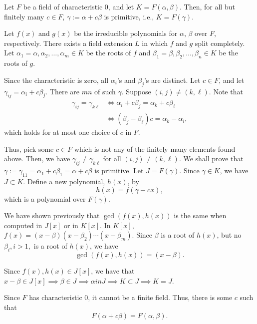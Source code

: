 
\begin{lem}\label{l35:lem1}
	Let $F$ be a field of characteristic $0$, and let $K = F(\alpha, \beta)$. Then, for all but finitely many $c \in F$, $\gamma := \alpha+ c \beta$ is primitive, i.e., $K = F(\gamma)$.
\end{lem}
\begin{dem}
	Let $f(x)$ and $g(x)$ be the irreducible polynomials for  $\alpha$, $\beta$ over $F$, respectively. There exists a field extension $L$ in which $f$ and $g$ split completely. Let $\alpha_1 = \alpha, \alpha_2, \dots, \alpha_m \in K$ be the roots of $f$ and $\beta_1 = \beta, \beta_2, \dots, \beta_n \in K$ be the roots of $g$.

	Since the characteristic is zero, all $\alpha_i$'s and $\beta_j$'s are distinct.  Let $c \in F$, and let $\gamma_{ij} = \alpha_i + c \beta_j$. There are $mn$ of such $\gamma$.  Suppose $(i, j) \neq (k, \ell)$. Note that
	\begin{align*}
		\gamma_{ij} = \gamma_{k\ell} &\iff \alpha_i + c\beta_j = \alpha_k + c\beta_\ell \\
									 &\iff (\beta_j - \beta_\ell)c = \alpha_k - \alpha_i,
	\end{align*}
	which holds for at most one choice of $c$ in $F$.

	Thus, pick some $c \in F$ which is not any of the finitely many elements found above. Then, we have $\gamma_{ij} \neq \gamma_{k\ell}$ for all  $(i, j) \neq (k, \ell)$.  We shall prove that $\gamma := \gamma_{11} = \alpha_1 + c\beta_1 = \alpha + c\beta$ is primitive. Let $J = F(\gamma)$. Since $\gamma \in K$, we have $J \subset K$.
	Define a new polynomial, $h(x)$, by \[
		h(x) = f(\gamma - cx),
	\]
	which is a polynomial over $F(\gamma)$.

	We have shown previously that $\gcd(f(x), h(x))$ is the same when computed in $J[x]$ or in $K[x]$. In $K[x]$, $f(x) = (x-\beta)(x-\beta_2)\cdots(x-\beta_m)$. Since $\beta$ is a root of $h(x)$, but no $\beta_i, i > 1,$ is a root of $h(x)$, we have \[
		\gcd(f(x), h(x)) = (x-\beta).
	\]

	Since $f(x), h(x) \in J[x]$, we have that $x - \beta \in J[x] \implies \beta \in J \implies \alpha in J \implies K \subset J \implies K = J$.
\end{dem}

\begin{rem}
	Since $F$ has characteristic $0$, it cannot be a finite field. Thus, there is some $c$ such that \[F(\alpha + c\beta) = F(\alpha, \beta).\]
\end{rem}

